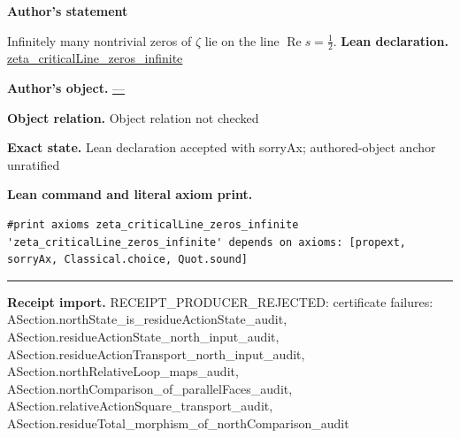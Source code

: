 \documentclass[11pt]{article}
\DeclareMathOperator{\re}{Re}
\theoremstyle{plain}
\theoremstyle{definition}
\theoremstyle{remark}
\begin{document}
\begin{tcolorbox}[provenancecard,title={5. Theorem - Hardy \textbackslash{}cite\{Hardy14\}},title after break={5. Theorem - Hardy \textbackslash{}cite\{Hardy14\} (continued)}]
\textbf{Author's statement}\par
Infinitely many nontrivial zeros of $\zeta$ lie on the line $\re s=\tfrac12$.
\tcblower
\textbf{Lean declaration.} \url{zeta_criticalLine_zeros_infinite}
\par\textbf{Author's object.} \url{—}
\par\textbf{Object relation.} Object relation not checked
\par\textbf{Exact state.} Lean declaration accepted with sorryAx; authored-object anchor unratified
\par\smallskip\textbf{Lean command and literal axiom print.}
\begin{Verbatim}[breaklines=true,breakanywhere=true,fontsize=\small]
#print axioms zeta_criticalLine_zeros_infinite
'zeta_criticalLine_zeros_infinite' depends on axioms: [propext, sorryAx, Classical.choice, Quot.sound]
\end{Verbatim}
\medskip\hrule\medskip
\textbf{Receipt import.} \textcolor{KgtRed}{RECEIPT\_PRODUCER\_REJECTED: certificate failures: ASection.northState\_is\_residueActionState\_audit, ASection.residueActionState\_north\_input\_audit, ASection.residueActionTransport\_north\_input\_audit, ASection.northRelativeLoop\_maps\_audit, ASection.northComparison\_of\_parallelFaces\_audit, ASection.relativeActionSquare\_transport\_audit, ASection.residueTotal\_morphism\_of\_northComparison\_audit}
\end{tcolorbox}
\medskip
\end{document}
